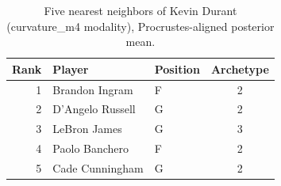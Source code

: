 \begin{table}[htbp]
  \centering\small
  \begin{tabular}{rllc}
    \toprule
    Rank & Player & Position & Archetype \\
    \midrule
    1 & Brandon Ingram & F & 2 \\
    2 & D'Angelo Russell & G & 2 \\
    3 & LeBron James & G & 3 \\
    4 & Paolo Banchero & F & 2 \\
    5 & Cade Cunningham & G & 2 \\
    \bottomrule
  \end{tabular}
  \caption{Five nearest neighbors of Kevin Durant (curvature_m4 modality), Procrustes-aligned posterior mean.}
  \label{tab:Kevin_Durant_neighbors_curvature_m4}
\end{table}

